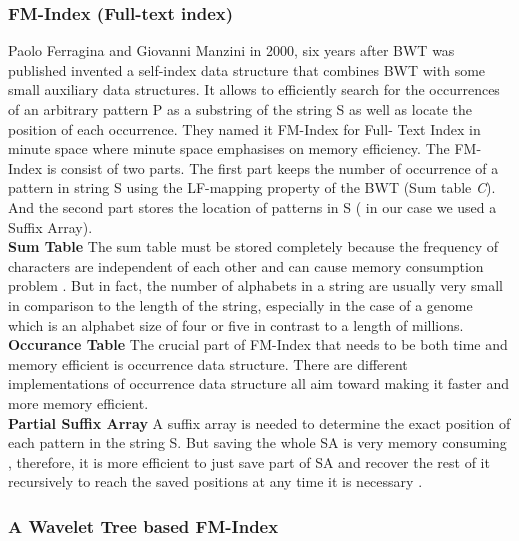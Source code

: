 \documentclass[11pt,a4paper]{report}
\begin{document}
\subsubsection{FM-Index (Full-text index)}  
\label{FM-Index (Full-text index)}

Paolo Ferragina and Giovanni Manzini in 2000, six years after BWT was 
published invented a self-index data structure that combines BWT with some 
small auxiliary data structures. It allows to efficiently search for the 
occurrences of an arbitrary pattern P as a substring of the string S as well 
as locate the position of each occurrence. They named it FM-Index for Full-
Text Index in minute space where minute space emphasises on memory efficiency.
The FM-Index is consist of two parts. The first part keeps the number of
occurrence of a pattern in string S using the LF-mapping property of the BWT (Sum table \emph{C}). 
And the second part stores the location of patterns in S ( in our case we used a Suffix Array)\cite{Wavthesis}.\\

\textbf{Sum Table}  The sum table must be stored completely because the frequency of characters
are independent of each other and can cause memory consumption problem \cite{Wavthesis}.
But in  fact, the number of alphabets in a string are usually very small in comparison to
the length of the string, especially in the case of a genome which is an alphabet size of 
four or five in contrast to a length of millions.
\\

\textbf{Occurance Table} The crucial part of FM-Index that needs to be 
both time and memory efficient is occurrence data structure\cite{Wavthesis}.
There are different implementations of occurrence data structure all aim toward making it faster and more memory efficient.
\\

\textbf{Partial Suffix Array} A suffix array is needed to determine the exact position of each pattern in the string S.
But saving the whole SA is very memory consuming , therefore,
it is more efficient to just save part of SA and recover the rest
of it recursively to reach the saved positions at any time it is necessary \cite{Wavthesis}.\\



\subsubsection{A Wavelet Tree based FM-Index} \label{A Wavelet Tree based FM-Index}
\end{document}
